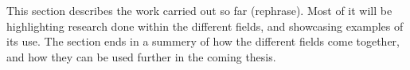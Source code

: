 \label{chap:Work Done}
This section describes the work carried out so far (rephrase). Most of it will be highlighting research done within the different fields, and showcasing examples of its use. The section ends in a summery of how the different fields come together, and how they can be used further in the coming thesis. 





